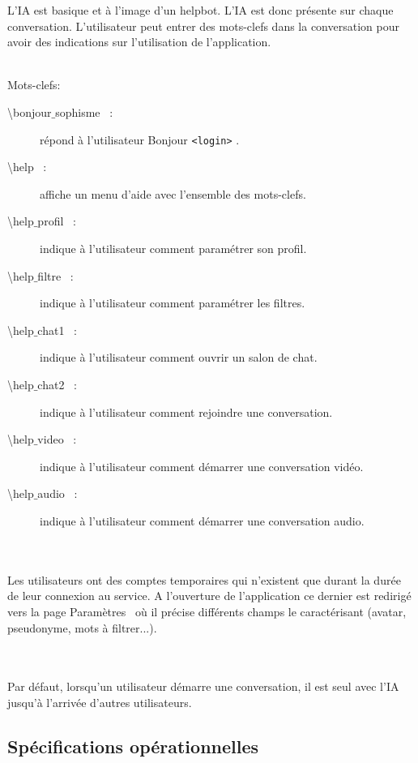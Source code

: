 \documentclass[11pt,dvipsnames,svgnames]{report}
\begin{document}
\begin{mdframed}[topline=false,rightline=false,bottomline=false, linewidth=3pt,linecolor=red]
L'IA est basique et à l'image d'un helpbot. L'IA est donc présente sur chaque conversation. L'utilisateur peut entrer des mots-clefs dans la conversation pour avoir des indications sur l'utilisation de l'application.

~\\
Mots-clefs:
\begin{description}
\item[\og \textbackslash bonjour$\_$sophisme \fg\ :] répond à l'utilisateur \og Bonjour \texttt{<login>} \fg.
\item[\og \textbackslash help \fg\ :] affiche un menu d'aide avec l'ensemble des mots-clefs.
\item[\og \textbackslash help$\_$profil \fg\ :] indique à l'utilisateur comment paramétrer son profil.
\item[\og \textbackslash help$\_$filtre \fg\ :] indique à l'utilisateur comment paramétrer les filtres.
\item[\og \textbackslash help$\_$chat1 \fg\ :] indique à l'utilisateur comment ouvrir un salon de chat.
\item[\og \textbackslash help$\_$chat2 \fg\ :] indique à l'utilisateur comment rejoindre une conversation.
\item[\og \textbackslash help$\_$video \fg\ :] indique à l'utilisateur comment démarrer une conversation vidéo.
\item[\og \textbackslash help$\_$audio \fg\ :] indique à l'utilisateur comment démarrer une conversation audio.
\end{description}

~\\\\ 	

Les utilisateurs ont des comptes temporaires qui n'existent que durant la durée de leur connexion au service. A l'ouverture de l'application ce dernier est redirigé vers la page \og Paramètres \fg\ où il précise différents champs le caractérisant (avatar, pseudonyme, mots à filtrer...).

~\\\\ 
Par défaut, lorsqu'un utilisateur démarre une conversation, il est seul avec l'IA jusqu'à l'arrivée d'autres utilisateurs.
\end{mdframed}

\subsection{Spécifications opérationnelles}
\end{document}
